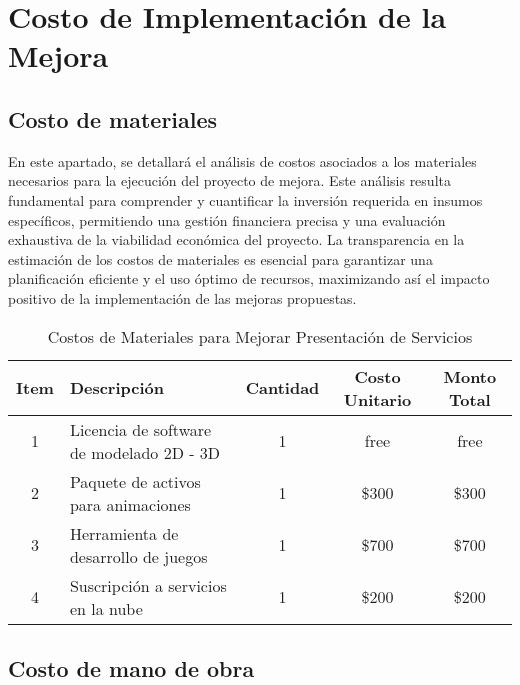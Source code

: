 \titlespacing{\chapter}{0pt}{120pt}{7pt}
\chapter{Costo de Implementación de la Mejora }
\label{cap:costo}

\section{Costo de materiales}

En este apartado, se detallará el análisis de costos asociados a los materiales necesarios 
para la ejecución del proyecto de mejora. Este análisis resulta fundamental para 
comprender y cuantificar la inversión requerida en insumos específicos, permitiendo una 
gestión financiera precisa y una evaluación exhaustiva de la viabilidad económica del 
proyecto. La transparencia en la estimación de los costos de materiales es esencial para 
garantizar una planificación eficiente y el uso óptimo de recursos, maximizando así el 
impacto positivo de la implementación de las mejoras propuestas.

\begin{table}[!ht]
    \centering
    \begin{tabular}{|c|p{5cm}|c|c|c|}
    \hline
    \textbf{Item} & \textbf{Descripción} & \textbf{Cantidad} & \textbf{Costo Unitario} & \textbf{Monto Total} \\
    \hline
    1 & Licencia de software de modelado 2D -  3D & 1 & free & free \\
    \hline
    2 & Paquete de activos para animaciones & 1 & \$300 & \$300 \\
    \hline
    3 & Herramienta de desarrollo de juegos & 1 & \$700 & \$700 \\
    \hline
    4 & Suscripción a servicios en la nube & 1 & \$200 & \$200 \\
    \hline
    \end{tabular}
    \caption{Costos de Materiales para Mejorar Presentación de Servicios}
    \label{tab:costos_materiales_proefex}
\end{table}

\section{Costo de mano de obra}

